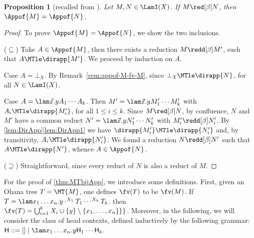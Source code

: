 \documentclass[10pt,a4paper]{amsart}
\newtheorem{proposition}[theorem]{Proposition}
\theoremstyle{definition}
\newtheorem{definition}[theorem]{Definition}
\providecommand{\todo}[2][]{}
\newcommand{\comgm}	[1]	{\todo[color=green]			{Giulio: #1}}
\begin{document}
\begin{proposition}[recalled from ]
	Let $M,N\in\LamI(X)$. If $M\red[\beta] N$, then $\Appof{M} = \Appof{N}$.
\end{proposition}

	\begin{proof}
	To prove $\Appof{M} = \Appof{N}$, we show the two inclusions.
	
	($\subseteq$)
	Take $A\in\Appof{M}$, then there exists a reduction $M\redd[\beta] M'$, 
	such that $A\MTle\dirapp{M'}$. We proceed by induction on $A$.
	
	Case $A = \bot_X$. By Remark~\ref{rem:appof-M-fv-M}, since $\bot_X\MTle 
	\dirapp{N}$, for all $N\in\LamI(X)$.
	
	Case $A = \lam\vec x.yA_1\cdots A_k$. 
	Then $M' = \lam\vec x.yM'_1\cdots M'_k$ with $A_i\MTle\dirapp{M'_i}$, 
	for all $1\le i \le k$.
	Since $M\red[\beta] N$, by confluence, $N$ and $M'$ have a common reduct 
	$N' = \lam\vec x.yN'_1\cdots N'_k$ with $M'_i\redd[\beta] N'_i$. By 
	\cref{lem:DirApp}\eqref{lem:DirApp1} we have 
	$\dirapp{M'_i}\MTle\dirapp{N'_i}$ and, by transitivity, 
	$A_i\MTle\dirapp{N'_i}$.
	We found a reduction $N\redd[\beta] N'$ such that $A\MTle \dirapp{N'}$, 
	whence $A\in\Appof{N}$.
	
	($\supseteq$) Straightforward, since every reduct of $N$ is also a 
	reduct of $M$.
	\end{proof}


For the proof of \cref{thm:MTbijApp}, we introduce some definitions.
First, given an Ohana tree $T = \MT{M}$, one defines
$\fv(T)$ to be $\fv(M)$.
If 
$T=\lam x_1\ldots x_n.y\cdot^{X_1}T_1\cdots^{X_k}T_k$.
then $\fv(T) = \bigcup_{i=1}^k X_i \cup \{y\} \setminus \{x_1,\dots,x_n\}\}\}$.
Moreover, in the following, we will consider the class of head contexts, defined inductively by the following grammar:
${\sf H} ::= [] \mid \lam x_1\ldots x_n.y{\sf H}_1\cdots {\sf H}_k.$
\end{document}
